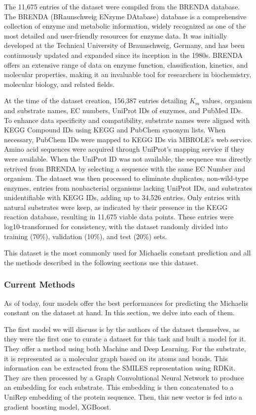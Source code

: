The 11,675 entries of the dataset were compiled from the BRENDA database. \cite{brenda} The BRENDA 
(BRaunschweig ENzyme DAtabase) database is a comprehensive collection of 
enzyme and metabolic information, widely recognized as one of the most detailed 
and user-friendly resources for enzyme data. It was initially developed at the Technical 
University of Braunschweig, Germany, and has been continuously updated and expanded since its 
inception in the 1980s. BRENDA offers an extensive range of data on enzyme function, 
classification, kinetics, and molecular properties, making it an invaluable tool for 
researchers in biochemistry, molecular biology, and related fields.

At the time of the dataset creation, 156,387 entries detailing $K_m$ values, organism and substrate names, 
EC numbers, UniProt IDs of enzymes, and PubMed IDs. To enhance data specificity and compatibility, 
substrate names were aligned with KEGG Compound IDs using KEGG and PubChem synonym lists. \cite{kegg}
When necessary, PubChem IDs were mapped to KEGG IDs via MBROLE's web service. \cite{pubchem,mbrole}
Amino acid sequences were acquired through UniProt's mapping service if they were available. \cite{uniprot}
When the UniProt ID was not available, the sequence was directly retrived from BRENDA by selecting a
sequence with the same EC Number and organism. The dataset was then processed to eliminate duplicates, 
non-wild-type enzymes, 
entries from nonbacterial organisms lacking UniProt IDs, and substrates unidentifiable with KEGG IDs, 
adding up to 34,526 entries. Only entries with natural substrates were keep, 
as indicated by their presence in the KEGG reaction database, resulting in 11,675 viable data points. 
These entries were log10-transformed for consistency, with the dataset randomly divided into training 
(70\%), validation (10\%), and test (20\%) sets. 

This dataset is the most commonly used for Michaelis constant prediction and all the methods described in the following sections use this dataset. 

\subsubsection{Current Methods}

As of today, four models offer the best performances for predicting the Michaelis constant on the dataset at hand. In this section, we delve into each of them.

The first model we will discuss is by the authors of the dataset themselves, \citeauthor{km1} as they were the first one to curate a dataset for this task and built a model for it. They offer a method using both Machine and Deep Learning. For the substrate, it is represented as a molecular graph based on its atoms and
bonds. This information can be extracted from the SMILES representation using RDKit. \cite{rdkit} They are then processed by a Graph Convolutional Neural Network to produce an embedding for each substrate. This embedding is then concatenated to a UniRep embedding of the protein sequence. \cite{unirep} Then, this new vector is fed into a gradient boosting model, XGBoost. \cite{xgboost}

